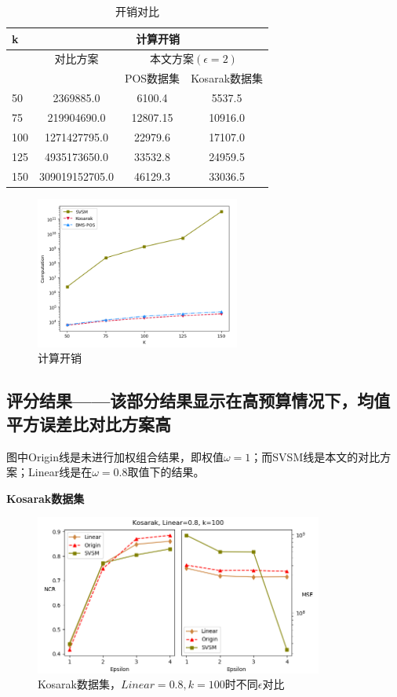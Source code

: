 \documentclass[UTF8,a4paper]{ctexart}
\begin{document}
\begin{table}[h]
		\centering
		\begin{tabular}{l|ccc}\hline
                k&\multicolumn{2}{r}{计算开销}\\\hline
                &对比方案&\multicolumn{2}{c}{本文方案$(\epsilon=2)$}\\
                & &POS数据集&Kosarak数据集\\
			50&2369885.0&6100.4&5537.5\\
                75&219904690.0&12807.15&10916.0\\
			100&1271427795.0&22979.6&17107.0\\
                125&4935173650.0&33532.8&24959.5 \\
			150&309019152705.0&46129.3&33036.5\\\hline
		\end{tabular}
		\caption{开销对比}
		\label{tab:computation}
\end{table}

\begin{figure}[h]
  \centering
  \includegraphics[width=0.6\textwidth]{computation}
  \caption{计算开销}
  \label{figure:computation}
\end{figure}

\newpage
\subsection{评分结果——该部分结果显示在高预算情况下，均值平方误差比对比方案高}
图中Origin线是未进行加权组合结果，即权值$\omega=1$；而SVSM线是本文的对比方案；Linear线是在$\omega=0.8$取值下的结果。

\textbf{Kosarak数据集}

  \begin{figure}[htbp]
    \centering
    \includegraphics[width=0.845\textwidth]{kosarak_compare}
    \caption{Kosarak数据集，$Linear=0.8,k=100$时不同$\epsilon$对比}
    \label{fig:kosarak_compare}
  \end{figure}
\end{document}
